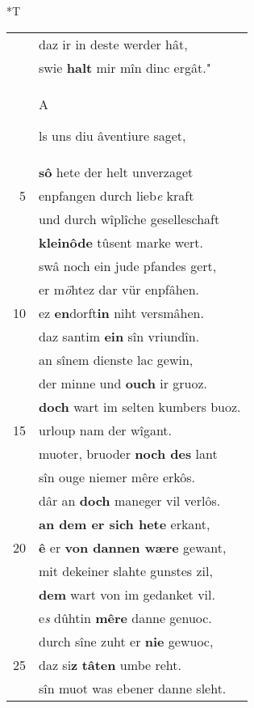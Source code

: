 \documentclass[8pt,a4paper,notitlepage]{article}
\begin{document}
\begin{table}[ht]
\begin{minipage}[t]{0.5\linewidth}
\end{minipage}
\hspace{0.5cm}
\begin{minipage}[t]{0.5\linewidth}
\small
\begin{center}*T
\end{center}
\begin{tabular}{rl}
 & daz ir in deste werder hât,\\ 
 & swie \textbf{halt} mir mîn dinc ergât."\\ 
 & \begin{large}A\end{large}ls uns diu âventiure saget,\\ 
 & \textbf{sô} hete der helt unverzaget\\ 
5 & enpfangen durch lieb\textit{e} kraft\\ 
 & und durch wîplîche geselleschaft\\ 
 & \textbf{kleinôde} tûsent marke wert.\\ 
 & swâ noch ein jude pfandes gert,\\ 
 & er m\textit{ö}htez dar vür enpfâhen.\\ 
10 & ez \textbf{en}dorft\textbf{in} niht versmâhen.\\ 
 & daz santim \textbf{ein} sîn vriundîn.\\ 
 & an sînem dienste lac gewin,\\ 
 & der minne und \textbf{ouch} ir gruoz.\\ 
 & \textbf{doch} wart im selten kumbers buoz.\\ 
15 & urloup nam der wîgant.\\ 
 & muoter, bruoder \textbf{noch des} lant\\ 
 & sîn ouge niemer mêre erkôs.\\ 
 & dâr an \textbf{doch} maneger vil verlôs.\\ 
 & \textbf{an dem er sich hete} erkant,\\ 
20 & \textbf{ê} er \textbf{von dannen wære} gewant,\\ 
 & mit dekeiner slahte gunstes zil,\\ 
 & \textbf{dem} wart von im gedanket vil.\\ 
 & e\textit{s} dûhtin \textbf{mêre} danne genuoc.\\ 
 & durch sîne zuht er \textbf{nie} gewuoc,\\ 
25 & daz si\textbf{z} \textbf{tâten} umbe reht.\\ 
 & sîn muot was ebener danne sleht.\\ 

\end{tabular}
\end{minipage}
\end{table}
\end{document}
